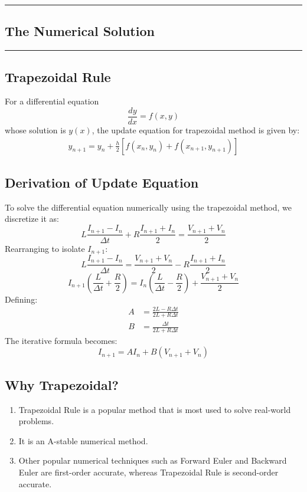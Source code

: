 \newpage
{\color{gray}\hrule}
\begin{center}
\section{The Numerical Solution}
\bigskip
\end{center}
{\color{gray}\hrule}
\begin{multicols}{2}

\subsection{Trapezoidal Rule}
For a differential equation $$\frac{dy}{dx} = f(x,y)$$ whose solution is $y(x)$, the update equation for trapezoidal method is given by:
\begin{align}
    y_{n+1} = y_n + \frac{h}{2}\left[ f(x_n,y_n) + f(x_{n+1},y_{n+1}) \right]
\end{align}
\subsection{Derivation of Update Equation}
To solve the differential equation numerically using the trapezoidal method, we discretize it as:
\begin{equation}
L \frac{I_{n+1} - I_n}{\Delta t} + R \frac{I_{n+1} + I_n}{2} = \frac{V_{n+1} + V_n}{2}
\end{equation}
Rearranging to isolate $I_{n+1}$:
\begin{equation}
L \frac{I_{n+1} - I_n}{\Delta t} = \frac{V_{n+1} + V_n}{2} - R \frac{I_{n+1} + I_n}{2}
\end{equation}
\begin{equation}
I_{n+1} \left( \frac{L}{\Delta t} + \frac{R}{2} \right) = I_n \left( \frac{L}{\Delta t} - \frac{R}{2} \right) + \frac{V_{n+1} + V_n}{2}
\end{equation}
Defining:
\begin{align}
A &= \frac{2L - R \Delta t}{2L + R \Delta t} \\
B &= \frac{\Delta t}{2L + R \Delta t}
\end{align}
The iterative formula becomes:
\begin{equation}
I_{n+1} = A I_n + B (V_{n+1} + V_n)
\end{equation}
\subsection{Why Trapezoidal?}
\begin{enumerate}
    \item Trapezoidal Rule is a popular method that is most used to solve real-world problems.
    \item It is an A-stable numerical method.
    \item Other popular numerical techniques such as Forward Euler and Backward Euler are first-order accurate, whereas Trapezoidal Rule is second-order accurate.
\end{enumerate}


\end{multicols}
